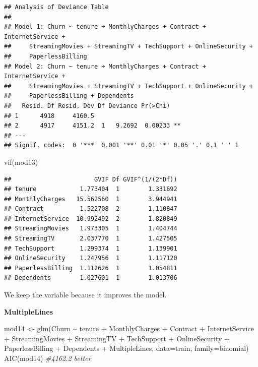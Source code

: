 \documentclass[
  twoside]{article}
\newenvironment{Shaded}{\begin{snugshade}}{\end{snugshade}}
\newcommand{\AttributeTok}[1]{\textcolor[rgb]{0.77,0.63,0.00}{#1}}
\newcommand{\CommentTok}[1]{\textcolor[rgb]{0.56,0.35,0.01}{\textit{#1}}}
\newcommand{\FunctionTok}[1]{\textcolor[rgb]{0.00,0.00,0.00}{#1}}
\newcommand{\NormalTok}[1]{#1}
\newcommand{\OtherTok}[1]{\textcolor[rgb]{0.56,0.35,0.01}{#1}}
\newcommand{\SpecialCharTok}[1]{\textcolor[rgb]{0.00,0.00,0.00}{#1}}
\begin{document}
\begin{verbatim}
## Analysis of Deviance Table
## 
## Model 1: Churn ~ tenure + MonthlyCharges + Contract + InternetService + 
##     StreamingMovies + StreamingTV + TechSupport + OnlineSecurity + 
##     PaperlessBilling
## Model 2: Churn ~ tenure + MonthlyCharges + Contract + InternetService + 
##     StreamingMovies + StreamingTV + TechSupport + OnlineSecurity + 
##     PaperlessBilling + Dependents
##   Resid. Df Resid. Dev Df Deviance Pr(>Chi)   
## 1      4918     4160.5                        
## 2      4917     4151.2  1   9.2692  0.00233 **
## ---
## Signif. codes:  0 '***' 0.001 '**' 0.01 '*' 0.05 '.' 0.1 ' ' 1
\end{verbatim}

\begin{Shaded}
\begin{Highlighting}[]
\FunctionTok{vif}\NormalTok{(mod13)}
\end{Highlighting}
\end{Shaded}

\begin{verbatim}
##                       GVIF Df GVIF^(1/(2*Df))
## tenure            1.773404  1        1.331692
## MonthlyCharges   15.562560  1        3.944941
## Contract          1.522708  2        1.110847
## InternetService  10.992492  2        1.820849
## StreamingMovies   1.973305  1        1.404744
## StreamingTV       2.037770  1        1.427505
## TechSupport       1.299374  1        1.139901
## OnlineSecurity    1.247956  1        1.117120
## PaperlessBilling  1.112626  1        1.054811
## Dependents        1.027601  1        1.013706
\end{verbatim}

We keep the variable because it improves the model.

\textbf{MultipleLines}

\begin{Shaded}
\begin{Highlighting}[]
\NormalTok{mod14 }\OtherTok{\textless{}{-}} \FunctionTok{glm}\NormalTok{(Churn }\SpecialCharTok{\textasciitilde{}}\NormalTok{ tenure }\SpecialCharTok{+}\NormalTok{ MonthlyCharges }\SpecialCharTok{+}\NormalTok{ Contract }\SpecialCharTok{+}\NormalTok{ InternetService }\SpecialCharTok{+} 
\NormalTok{               StreamingMovies }\SpecialCharTok{+}\NormalTok{ StreamingTV }\SpecialCharTok{+}\NormalTok{ TechSupport }\SpecialCharTok{+}\NormalTok{ OnlineSecurity }\SpecialCharTok{+} 
\NormalTok{               PaperlessBilling }\SpecialCharTok{+}\NormalTok{ Dependents }\SpecialCharTok{+}\NormalTok{ MultipleLines,}
             \AttributeTok{data=}\NormalTok{train, }\AttributeTok{family=}\NormalTok{binomial)}
\FunctionTok{AIC}\NormalTok{(mod14) }\CommentTok{\#4162.2 better}
\end{Highlighting}
\end{Shaded}
\end{document}
